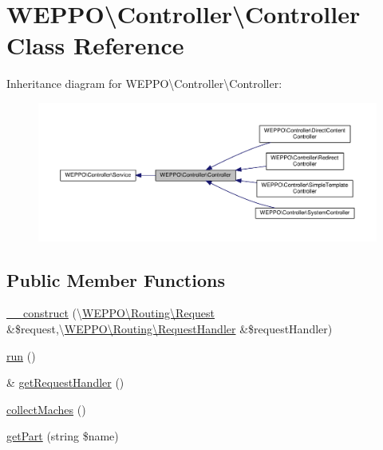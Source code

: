 \hypertarget{classWEPPO_1_1Controller_1_1Controller}{}\section{W\+E\+P\+PO\textbackslash{}Controller\textbackslash{}Controller Class Reference}
\label{classWEPPO_1_1Controller_1_1Controller}


Inheritance diagram for W\+E\+P\+PO\textbackslash{}Controller\textbackslash{}Controller\+:\nopagebreak
\begin{figure}[H]
\begin{center}
\leavevmode
\includegraphics[width=350pt]{classWEPPO_1_1Controller_1_1Controller__inherit__graph}
\end{center}
\end{figure}
\subsection*{Public Member Functions}
\begin{DoxyCompactItemize}
\item 
\hyperlink{classWEPPO_1_1Controller_1_1Controller_a5a5dfa8ba627ddac02675d0c1fb44b92}{\+\_\+\+\_\+construct} (\textbackslash{}\hyperlink{classWEPPO_1_1Routing_1_1Request}{W\+E\+P\+P\+O\textbackslash{}\+Routing\textbackslash{}\+Request} \&\$request,\textbackslash{}\hyperlink{classWEPPO_1_1Routing_1_1RequestHandler}{W\+E\+P\+P\+O\textbackslash{}\+Routing\textbackslash{}\+Request\+Handler} \&\$request\+Handler)
\item 
\hyperlink{classWEPPO_1_1Controller_1_1Controller_abfdc2454689d032a81a7eddee91b7445}{run} ()
\item 
\& \hyperlink{classWEPPO_1_1Controller_1_1Controller_af32d3de1298eb0c19ba07585f207ad1c}{get\+Request\+Handler} ()
\item 
\hyperlink{classWEPPO_1_1Controller_1_1Controller_a8710ee71c9768e78b7e5d15c8624602f}{collect\+Maches} ()
\item 
\hyperlink{classWEPPO_1_1Controller_1_1Controller_ab9a68bc1c7f77d9fd2e620e4c0fb4e84}{get\+Part} (string \$name)
\end{DoxyCompactItemize}
